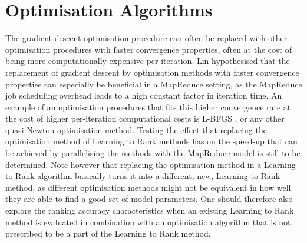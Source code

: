 \section{Optimisation Algorithms}
The gradient descent optimisation procedure can often be replaced with other optimisation procedures with faster convergence properties, often at the cost of being more computationally expensive per iteration. Lin \cite{Lin2013} hypothesised that the replacement of gradient descent by optimisation methods with faster convergence properties can especially be beneficial in a MapReduce setting, as the MapReduce job scheduling overhead leads to a high constant factor in iteration time. An example of an optimisation procedures that fits this higher convergence rate at the cost of higher per-iteration computational costs is L-BFGS \cite{Liu1989}, or any other quasi-Newton optimisation method. Testing the effect that replacing the optimisation method of Learning to Rank methods has on the speed-up that can be achieved by parallelising the methods with the MapReduce model is still to be determined. Note however that replacing the optimisation method in a Learning to Rank algorithm basically turns it into a different, new, Learning to Rank method, as different optimisation methods might not be equivalent in how well they are able to find a good set of model parameters. One should therefore also explore the ranking accuracy characteristics when an existing Learning to Rank method is evaluated in combination with an optimisation algorithm that is not prescribed to be a part of the Learning to Rank method.